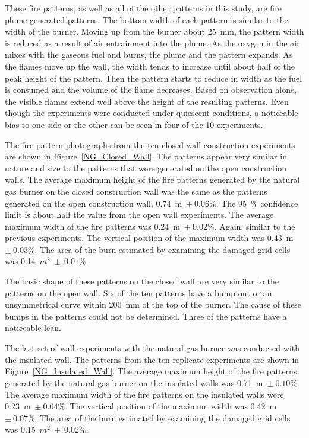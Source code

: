 \documentclass[twoside]{uocthesis}
\begin{document}
{These fire patterns, as well as all of the other patterns in this study, are fire plume generated patterns. The bottom width of each pattern is similar to the width of the burner. Moving up from the burner about 25~mm, the pattern width is reduced as a result of air entrainment into the plume.  As the oxygen in the air mixes with the gaseous fuel and burns, the plume and the pattern expands.  As the flames move up the wall, the width tends to increase until about half of the peak height of the pattern.  Then the pattern starts to reduce in width as the fuel is consumed and the volume of the flame decreases.  Based on observation alone, the visible flames extend well above the height of the resulting patterns.  Even though the experiments were conducted under quiescent conditions, a noticeable bias to one side or the other can be seen in four of the 10 experiments.           

The fire pattern photographs from the ten closed wall construction experiments are shown in Figure~\ref{NG_Closed_Wall}. 
The patterns appear very similar in nature and size to the patterns that were generated on the open construction walls.  The average maximum height of the fire patterns generated by the natural gas burner on the closed construction wall was the same as the patterns generated on the open construction wall, 0.74~m~$\pm~0.06\%$.  The 95~$\%$ confidence limit is about half the value from the open wall experiments. The average maximum width of the fire patterns was 0.24~m~$\pm~0.02\%$.  Again, similar to the previous experiments. The vertical position of the maximum width was 0.43~m~$\pm~0.03\%$. The area of the burn estimated by examining the damaged grid cells was 0.14~$m^2~\pm~0.01\%$.  

The basic shape of these patterns on the closed wall are very similar to the patterns on the open wall.  Six of the ten patterns have a bump out or an unsymmetrical curve within 200~mm of the top of the burner.  The cause of these bumps in the patterns could not be determined. Three of the patterns have a noticeable lean.     
  
The last set of wall experiments with the natural gas burner was conducted with the insulated wall.  The patterns from the ten replicate experiments are shown in Figure~\ref{NG_Insulated_Wall}.  The average maximum height of the fire patterns generated by the natural gas burner on the insulated walls was 0.71~m~$\pm~0.10\%$.  The average maximum width of the fire patterns on the insulated walls were 0.23~m~$\pm~0.04\%$.  The vertical position of the maximum width was 0.42~m~$\pm~0.07\%$. The area of the burn estimated by examining the damaged grid cells was 0.15~$m^2~\pm~0.02\%$.  

}
\end{document}
